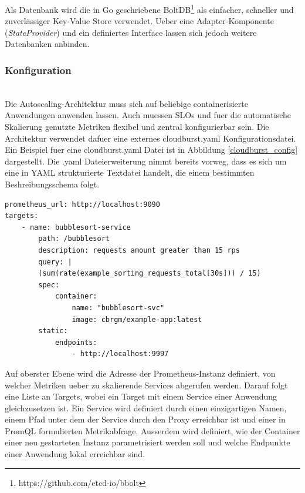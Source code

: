 \documentclass[runningheads]{llncs}
\begin{document}
Als Datenbank wird die in Go geschriebene BoltDB\footnote{https://github.com/etcd-io/bbolt} als einfacher, schneller und zuverlässiger Key-Value Store verwendet. Ueber eine Adapter-Komponente (\textit{StateProvider}) und ein definiertes Interface lassen sich jedoch weitere Datenbanken anbinden.

\subsubsection{Konfiguration} \label{configuration} \hfill\\

Die Autoscaling-Architektur muss sich auf beliebige containerisierte Anwendungen anwenden lassen. Auch muessen SLOs und fuer die automatische Skalierung genutzte Metriken flexibel und zentral konfigurierbar sein. Die Architektur verwendet dafuer eine externes cloudburst.yaml Konfigurationsdatei. Ein Beispiel fuer eine cloudburst.yaml Datei ist in Abbildung \ref{cloudburst_config} dargestellt. Die .yaml Dateierweiterung nimmt bereits vorweg, dass es sich um eine in YAML strukturierte Textdatei handelt, die einem bestimmten Beshreibungsschema folgt. \\

\begin{lstlisting}[label={cloudburst_config}, caption={Ein Beispiel fuer eine \textbf{cloudburst.yaml} Datei. Definiert wird ein Service mit einer Abfrage formuliert in PromQL, einer Angabe der Parameter fuer zu startende Container-Instanzen (\textit{spec}) und eine Liste von lokal erreichbaren Endpunkten (\textit{static})},captionpos=b]
prometheus_url: http://localhost:9090
targets:
	- name: bubblesort-service
		path: /bubblesort
		description: requests amount greater than 15 rps
		query: |
		(sum(rate(example_sorting_requests_total[30s])) / 15)
		spec:
			container:
				name: "bubblesort-svc"
				image: cbrgm/example-app:latest
		static:
			endpoints:
				- http://localhost:9997
\end{lstlisting}

Auf oberster Ebene wird die Adresse der Prometheus-Instanz definiert, von welcher Metriken ueber zu skalierende Services abgerufen werden. Darauf folgt eine Liste an Targets, wobei ein Target mit einem Service einer Anwendung gleichzusetzen ist. Ein Service wird definiert durch einen einzigartigen Namen, einem Pfad unter dem der Service durch den Proxy erreichbar ist und einer in PromQL formulierten Metrikabfrage. Ausserdem wird definiert, wie der Container einer neu gestarteten Instanz parametrisiert werden soll und welche Endpunkte einer Anwendung lokal erreichbar sind.
\end{document}
